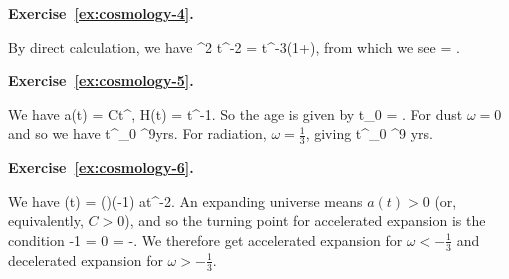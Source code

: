 \bigskip
\noindent\textbf{Exercise~\ref{ex:cosmology-4}.}\label{sol:cosmology-4}

By direct calculation, we have
\bse
    \a^2 t^{-2} =  t^{-3\a(1+\omega)},
\ese
from which we see
\bse
    \a = .
\ese

\bigskip
\noindent\textbf{Exercise~\ref{ex:cosmology-5}.}\label{sol:cosmology-5}

We have
\bse
    a(t) = C\cdot t^{}, \qquad \implies \qquad H(t) = t^{-1}.
\ese
So the age is given by
\bse
    t_0 = .
\ese
For dust $\omega=0$ and so we have
\bse
    t^{}_0 ^9yrs.
\ese
For radiation, $\omega=\frac{1}{3}$, giving
\bse
    t^{}_0  ^9 yrs.
\ese

\bigskip
\noindent\textbf{Exercise~\ref{ex:cosmology-6}.}\label{sol:cosmology-6}

We have
\bse
    (t) = \bigg(\bigg)\bigg(-1\bigg) \cdot a\cdot t^{-2}.
\ese
An expanding universe means $a(t)>0$ (or, equivalently, $C>0$), and so the turning point for accelerated expansion is the condition
\bse
    -1 = 0 \qquad \implies \qquad \omega = -.
\ese
We therefore get accelerated expansion for $\omega<-\frac{1}{3}$ and decelerated expansion for $\omega >-\frac{1}{3}$.
